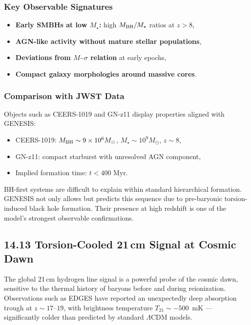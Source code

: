 \documentclass{article}
\begin{document}
\subsubsection*{Key Observable Signatures}
\begin{itemize}
  \item \textbf{Early SMBHs at low $M_\star$:} high $M_{\rm BH}/M_\star$ ratios at $z > 8$,
  \item \textbf{AGN-like activity without mature stellar populations},
  \item \textbf{Deviations from $M$–$\sigma$ relation} at early epochs,
  \item \textbf{Compact galaxy morphologies around massive cores}.
\end{itemize}

\subsubsection*{Comparison with JWST Data}
Objects such as CEERS-1019 and GN-z11 display properties aligned with GENESIS:
\begin{itemize}
  \item CEERS-1019: $M_{\rm BH} \sim 9 \times 10^6 M_\odot$, $M_\star \sim 10^9 M_\odot$, $z \sim 8$,
  \item GN-z11: compact starburst with unresolved AGN component,
  \item Implied formation time: $t < 400$ Myr.
\end{itemize}

\begin{tcolorbox}[colback=gray!5, colframe=black!30, title=Why this matters]
BH-first systems are difficult to explain within standard hierarchical formation. GENESIS not only allows but predicts this sequence due to pre-baryonic torsion-induced black hole formation. Their presence at high redshift is one of the model’s strongest observable confirmations.
\end{tcolorbox}


\subsection*{14.13 Torsion-Cooled 21\,cm Signal at Cosmic Dawn}
\label{sec:21cm_torsion}

The global 21\,cm hydrogen line signal is a powerful probe of the cosmic dawn, sensitive to the thermal history of baryons before and during reionization. Observations such as EDGES have reported an unexpectedly deep absorption trough at $z \sim 17$--$19$, with brightness temperature $T_{21} \sim -500$~mK — significantly colder than predicted by standard $\Lambda$CDM models.
\end{document}
